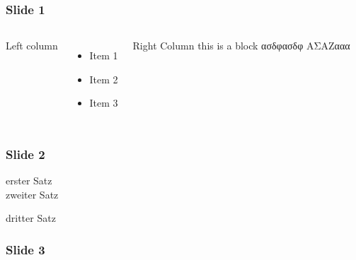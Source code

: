 \begin{frame}
  \frametitle{Slide 1}
  \begin{columns}[T]
    Left column
    \begin{itemize}
      \item Item 1
      \item Item 2
      \item Item 3
    \end{itemize}
    \begin{block}{Right Column}
      this is a block
      ασδφασδφ ΑΣΑΖααα
    \end{block}
  \end{columns}
\end{frame}

\begin{frame}
  \frametitle{Slide 2}
  erster Satz\\
  zweiter Satz

  \pause

  dritter Satz
\end{frame}

\begin{frame}
  \frametitle{Slide 3}
  \\
  \\
\end{frame}